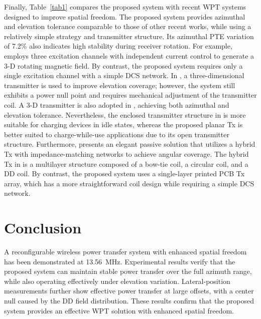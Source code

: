 \documentclass[journal]{IEEEtran}
\begin{document}
Finally, Table~\ref{tab1} compares the proposed system with recent WPT systems designed to improve spatial freedom. The proposed system provides azimuthal and elevation tolerance comparable to those of other recent works, while using a relatively simple strategy and transmitter structure. Its azimuthal PTE variation of 7.2\% also indicates high stability during receiver rotation. For example, \cite{consu} employs three excitation channels with independent current control to generate a 3-D rotating magnetic field. By contrast, the proposed system requires only a single excitation channel with a simple DCS network. In \cite{comp2}, a three-dimensional transmitter is used to improve elevation coverage; however, the system still exhibits a power null point and requires mechanical adjustment of the transmitter coil. A 3-D transmitter is also adopted in \cite{3D}, achieving both azimuthal and elevation tolerance. Nevertheless, the enclosed transmitter structure in \cite{3D} is more suitable for charging devices in idle states, whereas the proposed planar Tx is better suited to charge-while-use applications due to its open transmitter structure. Furthermore, \cite{hybrid} presents an elegant passive solution that utilizes a hybrid Tx with impedance-matching networks to achieve angular coverage. The hybrid Tx in \cite{hybrid} is a multilayer structure composed of a bow-tie coil, a circular coil, and a DD coil. By contrast, the proposed system uses a single-layer printed PCB Tx array, which has a more straightforward coil design while requiring a simple DCS network. 


\section{Conclusion}
A reconfigurable wireless power transfer system with enhanced spatial freedom has been demonstrated at 13.56~MHz. Experimental results verify that the proposed system can maintain stable power transfer over the full azimuth range, while also operating effectively under elevation variation. Lateral-position measurements further show effective power transfer at large offsets, with a center null caused by the DD field distribution. These results confirm that the proposed system provides an effective WPT solution with enhanced spatial freedom.
\end{document}
